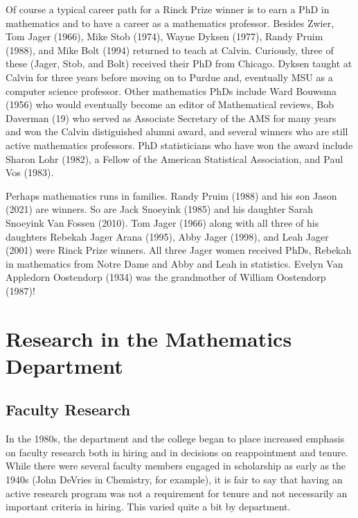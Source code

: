 \documentclass[
]{book}
\begin{document}
Of course a typical career path for a Rinck Prize winner is to earn a PhD in mathematics and to have a career as a mathematics professor. Besides Zwier, Tom Jager (1966), Mike Stob (1974), Wayne Dyksen (1977), Randy Pruim (1988), and Mike Bolt (1994) returned to teach at Calvin. Curiously, three of these (Jager, Stob, and Bolt) received their PhD from Chicago. Dyksen taught at Calvin for three years before moving on to Purdue and, eventually MSU as a computer science professor. Other mathematics PhDs include Ward Bouwsma (1956) who would eventually become an editor of Mathematical reviews, Bob Daverman (19) who served as Associate Secretary of the AMS for many years and won the Calvin distiguished alumni award, and several winners who are still active mathematics professors. PhD statisticians who have won the award include Sharon Lohr (1982), a Fellow of the American Statistical Association, and Paul Vos (1983).

Perhaps mathematics runs in families. Randy Pruim (1988) and his son Jason (2021) are winners. So are Jack Snoeyink (1985) and his daughter Sarah Snoeyink Van Fossen (2010). Tom Jager (1966) along with all three of his daughters Rebekah Jager Arana (1995), Abby Jager (1998), and Leah Jager (2001) were Rinck Prize winners. All three Jager women received PhDs, Rebekah in mathematics from Notre Dame and Abby and Leah in statistics. Evelyn Van Appledorn Oostendorp (1934) was the grandmother of William Oostendorp (1987)!

\hypertarget{research-in-the-mathematics-department}{%
\chapter{Research in the Mathematics Department}\label{research-in-the-mathematics-department}}

\hypertarget{faculty-research}{%
\section{Faculty Research}\label{faculty-research}}

In the 1980s, the department and the college began to place increased emphasis on faculty research both in hiring and in decisions on reappointment and tenure. While there were several faculty members engaged in scholarship as early as the 1940s (John DeVries in Chemistry, for example), it is fair to say that having an active research program was not a requirement for tenure and not necessarily an important criteria in hiring. This varied quite a bit by department.
\end{document}
